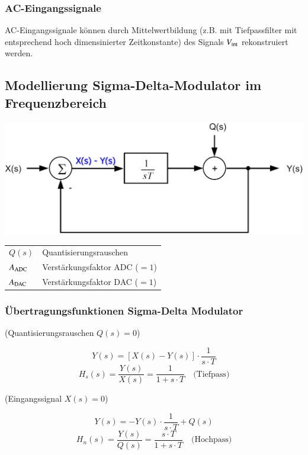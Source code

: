 \subsubsection{AC-Eingangssignale}

AC-Eingangssignale können durch Mittelwertbildung (z.B. mit Tiefpassfilter mit entsprechend hoch dimensinierter Zeitkonstante) 
des Signals $V_{\rm int}$ rekonstruiert werden.


\subsection{Modellierung Sigma-Delta-Modulator im Frequenzbereich}

\begin{minipage}[c]{0.4\columnwidth}
    \includegraphics[width=\columnwidth]{images/sigma-delta-modulator_frequenzbereich.png}
\end{minipage}
\hfill
\begin{minipage}[c]{0.58\columnwidth}

    \begin{tabular}{ll}
        $Q(s)$          & Quantisierungsrauschen \\
        $A_{\rm ADC}$   & Verstärkungsfaktor ADC ($=1$) \\
        $A_{\rm DAC}$   & Verstärkungsfaktor DAC ($=1$) 
    \end{tabular}
\end{minipage}


\subsubsection{Übertragungsfunktionen Sigma-Delta Modulator}

\begin{minipage}[t]{0.48\columnwidth}
    \begin{center}
        (Quantisierungsrauschen $Q(s) = 0$)
    \end{center}
    $$ Y(s) = [X(s) - Y(s)] \cdot\frac{1}{s \cdot T} $$
    $$ \boxed{ H_s(s) = \frac{Y(s)}{X(s)} = \frac{1}{1 + s \cdot T} \quad \text{(Tiefpass)}} $$
\end{minipage}
\hfill
\begin{minipage}[t]{0.48\columnwidth}
    \begin{center}
        (Eingangssignal $X(s) = 0$)
    \end{center}
    $$ Y(s) = - Y(s) \cdot\frac{1}{s \cdot T} + Q(s) $$
    $$ \boxed{ H_n(s) = \frac{Y(s)}{Q(s)} = \frac{s \cdot T}{1 + s \cdot T} \quad \text{(Hochpass)}} $$
\end{minipage}

